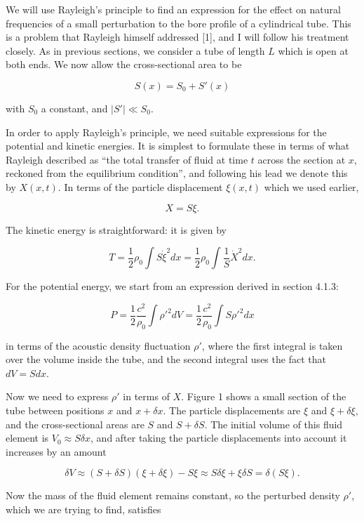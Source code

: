   We will use Rayleigh's principle to find an expression for the effect on 
  natural frequencies of a small perturbation to the bore profile of a 
  cylindrical tube. This is a problem that Rayleigh himself addressed [1], and 
  I will follow his treatment closely. As in previous sections, we consider a 
  tube of length $L$ which is open at both ends. We now allow the 
  cross-sectional area to be 

  $$S(x) = S_0 +S'(x) \tag{1}$$ 

  with $S_0$ a constant, and $|S'| \ll S_0$. 

  In order to apply Rayleigh's principle, we need suitable expressions for the 
  potential and kinetic energies. It is simplest to formulate these in terms of 
  what Rayleigh described as ``the total transfer of fluid at time $t$ across 
  the section at $x$, reckoned from the equilibrium condition'', and following 
  his lead we denote this by $X(x,t)$. In terms of the particle displacement 
  $\xi(x,t)$ which we used earlier, 

  $$X=S \xi . \tag{2}$$ 

  The kinetic energy is straightforward: it is given by 

  $$T=\dfrac{1}{2} \rho_0 \int{S \dot{\xi}^2 dx} = \dfrac{1}{2} \rho_0 
  \int{\dfrac{1}{S} \dot{X}^2 dx}. \tag{3}$$ 

  For the potential energy, we start from an expression derived in section 
  4.1.3: 

  $$P=\dfrac{1}{2} \dfrac{c^2}{\rho_0} \int{\rho'^2 dV}=\dfrac{1}{2} 
  \dfrac{c^2}{\rho_0} \int{S\rho'^2 dx} \tag{4}$$ 

  in terms of the acoustic density fluctuation $\rho'$, where the first 
  integral is taken over the volume inside the tube, and the second integral 
  uses the fact that $dV=S dx$. 

  Now we need to express $\rho'$ in terms of $X$. Figure 1 shows a small 
  section of the tube between positions $x$ and $x+\delta x$. The particle 
  displacements are $\xi$ and $\xi + \delta \xi$, and the cross-sectional areas 
  are $S$ and $S+\delta S$. The initial volume of this fluid element is $V_0 
  \approx S \delta x$, and after taking the particle displacements into account 
  it increases by an amount 

  $$\delta V \approx (S+\delta S)(\xi + \delta \xi) -S \xi \approx S \delta \xi 
  + \xi \delta S =\delta(S \xi) . \tag{5}$$ 

  Now the mass of the fluid element remains constant, so the perturbed density 
  $\rho'$, which we are trying to find, satisfies 

